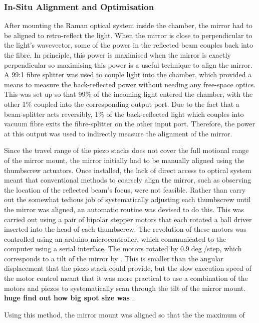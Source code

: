 \subsubsection{In-Situ Alignment and Optimisation}
After mounting the Raman optical system inside the chamber, the mirror had to
be aligned to retro-reflect the light. When the mirror is close to
perpendicular to the light's wavevector, some of the power in the reflected
beam couples back into the fibre. In principle, this power is maximised when
the mirror is exactly perpendicular so maximising this power is a useful
technique to align the mirror. A 99:1 fibre splitter was used to couple light
into the chamber, which provided a means to measure the back-reflected power
without needing any free-space optics. This was set up so that 99\% of the
incoming light entered the chamber, with the other 1\% coupled into the
corresponding output port. Due to the fact that a beam-splitter acts
reversibly, 1\% of the back-reflected light which couples into vacuum fibre
exits the fibre-splitter on the other input port. Therefore, the power at
this output was used to indirectly measure the alignment of the mirror.
\par\noindent
Since the travel range of the piezo stacks does not cover the full motional
range of the mirror mount, the mirror initially had to be manually aligned
using the thumbscrew actuators. Once installed, the lack of direct access to
optical system meant that conventional methods to coarsely align the mirror,
such as observing the location of the reflected beam's focus, were not
feasible. Rather than carry out the somewhat tedious job of systematically
adjusting each thumbscrew until the mirror was aligned, an automatic routine
was devised to do this. This was carried out using a pair of bipolar stepper
motors that each rotated a ball driver inserted into the head of each
thumbscrew. The revolution of these motors was controlled using an arduino
microcontroller, which communicated to the computer using a serial interface.
The motors rotated by 0.9\(\deg\)/step, which corresponds to a tilt of the
mirror by . This is smaller than the
 angular displacement that the piezo stack could
provide, but the slow execution speed of the motor control meant that it was
more practical to use a combination of the motors and piezos to
systematically scan through the tilt of the mirror mount.
{\textbf {huge find out how big spot size was }}. \par\noindent
Using this method, the mirror mount was aligned so that the the maximum of
